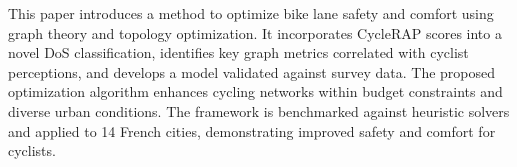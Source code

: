 \documentclass[lettersize,journal]{IEEEtran}
\begin{document}
This paper introduces a method to optimize bike lane safety and comfort using graph theory and topology optimization. It incorporates CycleRAP scores into a novel DoS classification, identifies key graph metrics correlated with cyclist perceptions, and develops a model validated against survey data. The proposed optimization algorithm enhances cycling networks within budget constraints and diverse urban conditions. The framework is benchmarked against heuristic solvers and applied to 14 French cities, demonstrating improved safety and comfort for cyclists.
\end{document}

